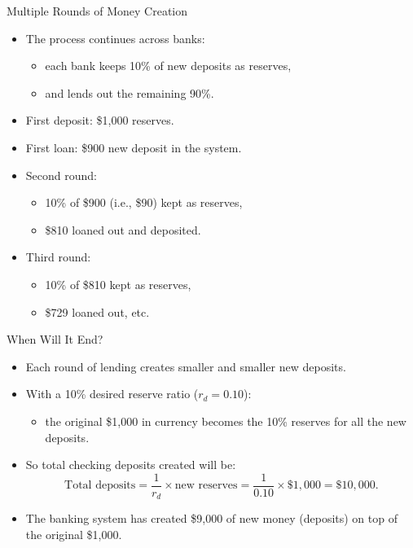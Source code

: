 \documentclass[aspectratio=169]{beamer}
\begin{document}
\begin{frame}{Multiple Rounds of Money Creation}
\transfade
\begin{itemize}[<+->]
  \item The process continues across banks:
  \begin{itemize}[<+->]
    \item each bank keeps 10\% of new deposits as reserves,
    \item and lends out the remaining 90\%.
  \end{itemize}
  \item First deposit: \$1{,}000 reserves.
  \item First loan: \$900 new deposit in the system.
  \item Second round:
  \begin{itemize}[<+->]
    \item 10\% of \$900 (i.e., \$90) kept as reserves,
    \item \$810 loaned out and deposited.
  \end{itemize}
  \item Third round:
  \begin{itemize}[<+->]
    \item 10\% of \$810 kept as reserves,
    \item \$729 loaned out, etc.
  \end{itemize}
\end{itemize}
\end{frame}

\begin{frame}{When Will It End?}
\transfade
\begin{itemize}[<+->]
  \item Each round of lending creates smaller and smaller new deposits.
  \item With a 10\% desired reserve ratio (\(r_{d} = 0.10\)):
  \begin{itemize}[<+->]
    \item the original \$1{,}000 in currency becomes the 10\% reserves for all the new deposits.
  \end{itemize}
  \item So total checking deposits created will be:
  \[
    \text{Total deposits} = \frac{1}{r_{d}} \times \text{new reserves}
    = \frac{1}{0.10} \times \$1{,}000 = \$10{,}000.
  \]
  \item The banking system has created \$9{,}000 of new money (deposits) on top of the original \$1{,}000.
\end{itemize}
\end{frame}
\end{document}
